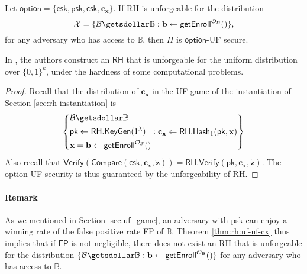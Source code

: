 \begin{theorem}
\label{thm:rh:uf-uf-cx}

Let $\textsf{option} = \{\textsf{esk}, \textsf{psk}, \textsf{csk}, \mathbf{c_x} \}$. If \textsf{RH} is unforgeable for the distribution
\[
	\mathcal{X} = \{ \mathcal{B} \getsdollar \mathbb{B}: \mathbf{b} \gets {\sf getEnroll}^{\mathcal{O}_\mathcal{B}}() \},
\]
for any adversary who has access to $\mathbb{B}$, then $\Pi$ is $\textsf{option}$-UF secure. 

\end{theorem}

In \cite{cryptoeprint:2014/394}, the authors construct an $\textsf{RH}$ that is unforgeable for the uniform distribution over $\{0, 1\}^k$, under the hardness of some computational problems.

\begin{proof}

Recall that the distribution of $\mathbf{c_x}$ in the \textsf{UF} game of the instantiation of Section \ref{sec:rh-instantiation} is
\[
	\left \{
		\begin{aligned} 
			 & \mathcal{B} \getsdollar \mathbb{B} \\
			 & \textsf{pk} \gets \textsf{RH.KeyGen}(1^\lambda) \\
			 & \mathbf{x} = \mathbf{b} \gets \textsf{getEnroll}^{\mathcal{O}_\mathcal{B}}() 
		\end{aligned} :
		\mathbf{c_x} \gets \textsf{RH.Hash}_1(\textsf{pk}, \mathbf{x})
	\right \}
\]
Also recall that $\textsf{Verify}(\textsf{Compare}(\textsf{csk}, \mathbf{c_x}, \mathbf{\tilde{z}} )) = \textsf{RH.Verify}(\textsf{pk}, \mathbf{c_x}, \mathbf{\tilde{z}} )$.
The \textsf{option}-UF security is thus guaranteed by the unforgeability of \textsf{RH}.

\end{proof}

\paragraph{Remark}
As we mentioned in Section \ref{sec:uf_game}, an adversary with \textsf{psk} can enjoy a winning rate of the false positive rate \textsf{FP} of $\mathbb{B}$. Theorem \ref{thm:rh:uf-uf-cx} thus implies that if $\textsf{FP}$ is not negligible, there does not exist an \textsf{RH} that is unforgeable for the distribution $\{ \mathcal{B} \getsdollar \mathbb{B}: \mathbf{b} \gets {\sf getEnroll}^{\mathcal{O}_\mathcal{B}}() \}$ for any adversary who has access to $\mathbb{B}$.



